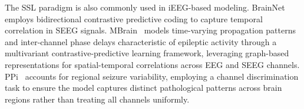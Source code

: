 The SSL paradigm is also commonly used in iEEG-based modeling. 
BrainNet~\cite{chen2022brainnet} employs bidirectional contrastive predictive coding to capture temporal correlation in SEEG signals.
MBrain~\cite{cai2023mbrain} models time-varying propagation patterns and inter-channel phase delays characteristic of epileptic activity through a multivariant contrastive-predictive learning framework, leveraging graph-based representations for spatial-temporal correlations across EEG and SEEG channels.
PPi~\cite{yuan2024ppi} accounts for regional seizure variability, employing a channel discrimination task to ensure the model captures distinct pathological patterns across brain regions rather than treating all channels uniformly.

